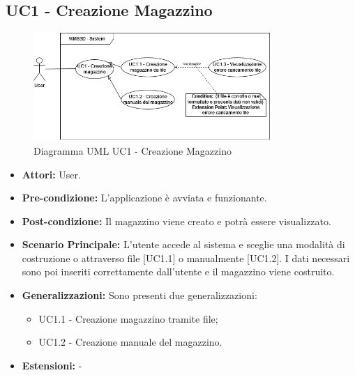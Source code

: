 \subsection{UC1 - Creazione Magazzino}
\begin{figure}[H]
    \centering
    \includegraphics[width=0.8\textwidth]{UC_diagrams_1-10/UC1_sys.drawio.png}
    \caption{Diagramma UML UC1 - Creazione Magazzino}
\end{figure}
\begin{itemize}
    \item \textbf{Attori:} User.
    \item \textbf{Pre-condizione:} L'applicazione è avviata e funzionante.
    \item \textbf{Post-condizione:} Il magazzino viene creato e potrà essere visualizzato.
    \item \textbf{Scenario Principale:}  L’utente accede al sistema e sceglie una modalità di costruzione o attraverso file [UC1.1] o manualmente [UC1.2]. I dati necessari sono poi inseriti correttamente dall'utente e il magazzino viene costruito.
    \item \textbf{Generalizzazioni:} Sono presenti due generalizzazioni: 
    \begin{itemize}
        \item UC1.1 - Creazione magazzino tramite file;
        \item UC1.2 - Creazione manuale del magazzino.
    \end{itemize}
    \item \textbf{Estensioni:} -
\end{itemize}


